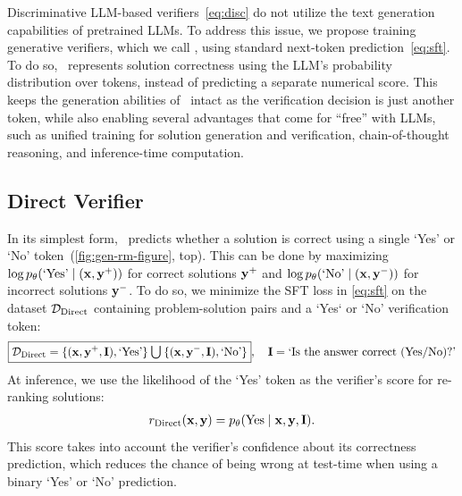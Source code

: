 

Discriminative LLM-based verifiers~\eqref{eq:disc} do not utilize the text generation capabilities of pretrained LLMs. To address this issue, we propose training generative verifiers, which we call \genV, using standard next-token prediction~\eqref{eq:sft}. To do so, \genV\ represents solution correctness using the LLM's probability distribution over tokens, instead of predicting a separate numerical score. This keeps the generation abilities of \genV\ intact as the verification decision is just another token, while also enabling several advantages that come for ``free'' with LLMs, such as unified training for solution generation and verification, chain-of-thought reasoning, and inference-time computation.

\subsection{Direct Verifier} In its simplest form, \genV\ predicts whether a solution is correct using a single `Yes' or `No' token~(\autoref{fig:gen-rm-figure}, top). This can be done by maximizing $\log p_\theta(\text{`Yes'} \mid ({\mathbf{x}}, {\mathbf{y}}^+))$
for correct solutions ${\mathbf{y}}^+$ and $\log p_\theta(\text{`No'} \mid ({\mathbf{x}}, {\mathbf{y}}^-))$ for incorrect solutions ${\mathbf{y}}^-$.
To do so, we minimize the SFT loss in \eqref{eq:sft} on the dataset ${\mathcal{D}}_{\mathrm{Direct}}$ containing problem-solution pairs and a `Yes` or `No' verification token:
\begin{align*}
\boxed{
\gD_{\mathrm{Direct}} = \{(\rvx, \rvy^+,\rmI), \text{`Yes'}\} \union \{(\rvx, \rvy^-, \rmI), \text{`No'}\}}, \quad \rmI = \text{`Is the answer correct (Yes/No)?'}
\end{align*}
At inference, we use the likelihood of the `Yes' token as the verifier's score for re-ranking solutions:
\begin{align}
    r_{\text{Direct}}({\mathbf{x}}, {\mathbf{y}}) = p_{\theta}(\text{Yes} \mid {\mathbf{x}}, {\mathbf{y}}, {\mathbf{I}}). 
\label{eq:gen-rm-direct}
\end{align}
This score takes into account the verifier's confidence about its correctness prediction, which reduces the chance of being wrong at test-time when using a binary `Yes' or `No' prediction.




